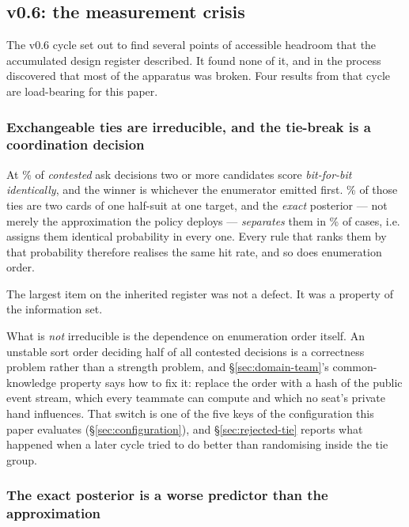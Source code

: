 \subsection{v0.6: the measurement crisis}
\label{sec:arc-vsix}

The v0.6 cycle set out to find several points of accessible headroom that the accumulated design
register described. It found none of it, and in the process discovered that most of the apparatus
was broken. Four results from that cycle are load-bearing for this paper.

\subsubsection{Exchangeable ties are irreducible, and the tie-break is a coordination decision}
\label{sec:arc-vsix-ties}

At \vsixTieShareFive\% of \emph{contested} ask decisions two or more candidates score
\emph{bit-for-bit identically}, and the winner is whichever the enumerator emitted first. \vsixTieSameSuitFive\% of those ties are
two cards of one half-suit at one target, and the \emph{exact} posterior --- not merely the approximation the policy
deploys --- \emph{separates} them in \vsixTieExactSepPctFive\% of cases, i.e. assigns them identical
probability in every one. Every rule that ranks them by that probability therefore
realises the same hit rate, and so does enumeration order.

The largest item on the inherited register was not a defect. It was a property of the information
set.

What is \emph{not} irreducible is the dependence on enumeration order itself. An unstable sort order
deciding half of all contested decisions is a correctness problem rather than a strength problem,
and \S\ref{sec:domain-team}'s common-knowledge property says how to fix it: replace the order with a
hash of the public event stream, which every teammate can compute and which no seat's private hand
influences. That switch is one of the five keys of the configuration this paper evaluates
(\S\ref{sec:configuration}), and \S\ref{sec:rejected-tie} reports what happened when a later cycle
tried to do better than randomising inside the tie group.

\subsubsection{The exact posterior is a worse predictor than the approximation}
\label{sec:arc-vsix-belief}


